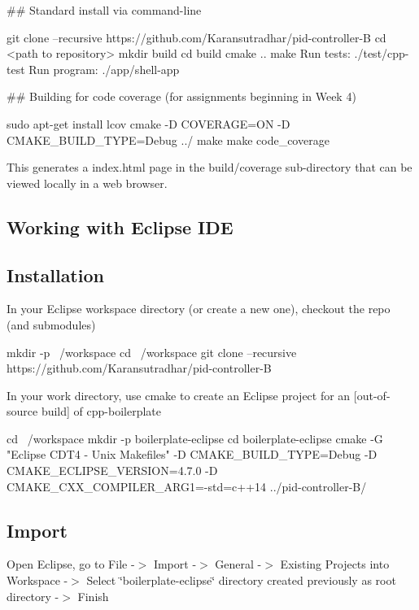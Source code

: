 \#\# Standard install via command-\/line 
\begin{DoxyCode}
git clone --recursive https://github.com/Karansutradhar/pid-controller-B
cd <path to repository>
mkdir build
cd build
cmake ..
make
Run tests: ./test/cpp-test
Run program: ./app/shell-app
\end{DoxyCode}


\#\# Building for code coverage (for assignments beginning in Week 4) 
\begin{DoxyCode}
sudo apt-get install lcov
cmake -D COVERAGE=ON -D CMAKE\_BUILD\_TYPE=Debug ../
make
make code\_coverage
\end{DoxyCode}
 This generates a index.\+html page in the build/coverage sub-\/directory that can be viewed locally in a web browser.

\subsection*{Working with Eclipse I\+DE}

\subsection*{Installation}

In your Eclipse workspace directory (or create a new one), checkout the repo (and submodules) 
\begin{DoxyCode}
mkdir -p ~/workspace
cd ~/workspace
git clone --recursive https://github.com/Karansutradhar/pid-controller-B
\end{DoxyCode}


In your work directory, use cmake to create an Eclipse project for an \mbox{[}out-\/of-\/source build\mbox{]} of cpp-\/boilerplate


\begin{DoxyCode}
cd ~/workspace
mkdir -p boilerplate-eclipse
cd boilerplate-eclipse
cmake -G "Eclipse CDT4 - Unix Makefiles" -D CMAKE\_BUILD\_TYPE=Debug -D CMAKE\_ECLIPSE\_VERSION=4.7.0 -D
       CMAKE\_CXX\_COMPILER\_ARG1=-std=c++14 ../pid-controller-B/
\end{DoxyCode}


\subsection*{Import}

Open Eclipse, go to File -\/$>$ Import -\/$>$ General -\/$>$ Existing Projects into Workspace -\/$>$ Select \char`\"{}boilerplate-\/eclipse\char`\"{} directory created previously as root directory -\/$>$ Finish

